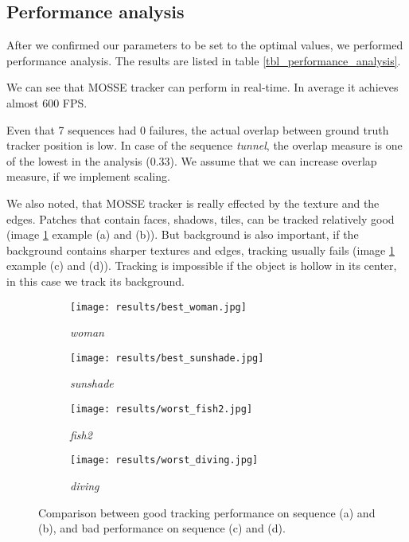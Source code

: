 \documentclass[runningheads]{llncs}
\begin{document}
\subsection{Performance analysis}

After we confirmed our parameters to be set to the optimal values, we performed performance analysis. The results are listed in table \ref{tbl_performance_analysis}.

We can see that MOSSE tracker can perform in real-time. In average it achieves almost 600 FPS.

Even that 7 sequences had 0 failures, the actual overlap between ground truth tracker position is low. In case of the sequence \textit{tunnel}, the overlap measure is one of the lowest in the analysis (0.33). We assume that we can increase overlap measure, if we implement scaling.

We also noted, that MOSSE tracker is really effected by the texture and the edges. Patches that contain faces, shadows, tiles, can be tracked relatively good (image \ref{img_tracker_best_worst} example (a) and (b)). But background is also important, if the background contains sharper textures and edges, tracking usually fails (image \ref{img_tracker_best_worst} example (c) and (d)). Tracking is impossible if the object is hollow in its center, in this case we track its background.

\begin{figure}
    \centering

    \begin{subfigure}{0.23\textwidth}
        \texttt{[image: results/best\_woman.jpg]}
        \caption{\textit{woman}}
    \end{subfigure}
    \hspace*{\fill}
    \begin{subfigure}{0.23\textwidth}
        \texttt{[image: results/best\_sunshade.jpg]}
        \caption{\textit{sunshade}}
    \end{subfigure}
    \hspace*{\fill}
    \begin{subfigure}{0.23\textwidth}
        \texttt{[image: results/worst\_fish2.jpg]}
        \caption{\textit{fish2}}
    \end{subfigure}
    \hspace*{\fill}
    \begin{subfigure}{0.23\textwidth}
        \texttt{[image: results/worst\_diving.jpg]}
        \caption{\textit{diving}}
    \end{subfigure}

    \caption{Comparison between good tracking performance on sequence (a) and (b), and bad performance on sequence (c) and (d). }
    \label{img_tracker_best_worst}
\end{figure}
\end{document}
